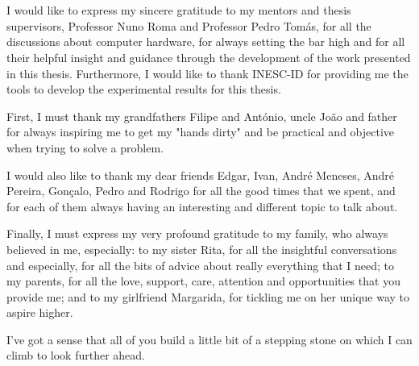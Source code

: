 
\section*{\acknowledgments}


I would like to express my sincere gratitude to my mentors and thesis supervisors, Professor Nuno Roma and Professor Pedro Tomás, for all the discussions about computer hardware, for always setting the bar high and for all their helpful insight and guidance through the development of the work presented in this thesis. Furthermore, I would like to thank INESC-ID for providing me the tools to develop the experimental results for this thesis.

First, I must thank my grandfathers Filipe and António, uncle João and father for always inspiring me to get my "hands dirty" and be practical and objective when trying to solve a problem.

I would also like to thank my dear friends Edgar, Ivan, André Meneses, André Pereira, Gonçalo, Pedro and Rodrigo for all the good times that we spent, and for each of them always having an interesting and different topic to talk about.

Finally, I must express my very profound gratitude to my family, who always believed in me, especially: 
to my sister Rita, for all the insightful conversations and especially, for all the bits of advice about really everything that I need;
to my parents, for all the love, support, care, attention and opportunities that you provide me;
and to my girlfriend Margarida, for tickling me on her unique way to aspire higher.

I've got a sense that all of you build a little bit of a stepping stone on which I can climb to look further ahead.
